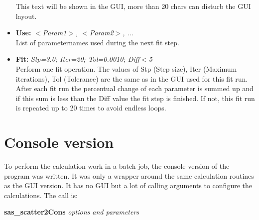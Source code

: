 \documentclass[11pt]{article} %
\begin{document}
\begin{itemize}
	This text will be shown in the GUI, more than 20 chars can disturb the GUI layout.
\item {\bf Use:} {\it $<$Param1$>$, $<$Param2$>$, ... } \\
	List of parameternames used during the next fit step.
\item {\bf Fit:} {\it Stp=3.0; Iter=20; Tol=0.0010; Diff$<$5} \\
	Perform one fit operation. The values of Stp (Step size), Iter (Maximum iterations), Tol (Tolerance) are the same as in the GUI used for this fit run. After each fit run the percentual change of each parameter is summed up and if this sum is less than the Diff value the fit step is finished. If not, this fit run is repeated up to 20 times to avoid endless loops.
\end{itemize}


%
%



\clearpage
\section{Console version}

To perform the calculation work in a batch job, the console version of the program was written. It was only a wrapper around the same calculation routines as the GUI version. It has no GUI but a lot of calling arguments to configure the calculations. The call is: \\
\centerline{{\bf sas\_scatter2Cons} {\it options and parameters}}
\end{document}
